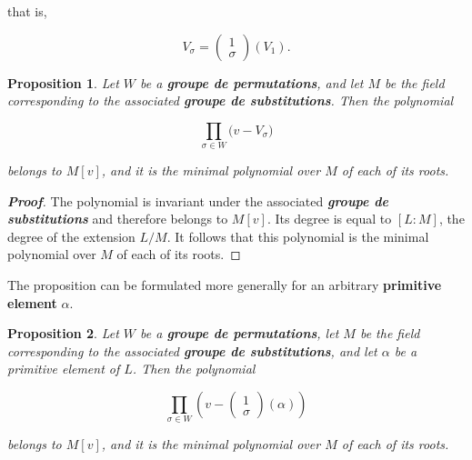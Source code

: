 \documentclass[a4paper,11pt]{article}
\newtheorem{proposition}{Proposition}
\begin{document}
that is,

\[
V_\sigma=
\begin{pmatrix}
1\\
\sigma
\end{pmatrix}(V_1).
\]

\begin{proposition}
\label{prop:nuttig}
Let \(W\) be a \textbf{\textit{groupe de permutations}}, and let \(M\) be the field corresponding to the associated \textbf{\textit{groupe de substitutions}}. Then the polynomial

\[
\prod_{\sigma\in W}\bigl(v-V_\sigma\bigr)
\]

belongs to \(M[v]\), and it is the minimal polynomial over \(M\) of each of its roots.
\end{proposition}

\begin{proof}[\normalfont\bfseries Proof]

The polynomial is invariant under the associated \textbf{\textit{groupe de substitutions}} and therefore belongs to \(M[v]\). Its degree is equal to \([L:M]\), the degree of the extension \(L/M\). It follows that this polynomial is the minimal polynomial over \(M\) of each of its roots.

\end{proof}

The proposition can be formulated more generally for an arbitrary \textbf{primitive element} \(\alpha\).

\begin{proposition}
\label{prop:nut}
Let \(W\) be a \textbf{\textit{groupe de permutations}}, let \(M\) be the field corresponding to the associated \textbf{\textit{groupe de substitutions}}, and let \(\alpha\) be a primitive element of \(L\). Then the polynomial

\[
\prod_{\sigma\in W}
\left(
v-
\begin{pmatrix}
	1\\
	\sigma
\end{pmatrix}(\alpha)
\right)
\]

belongs to \(M[v]\), and it is the minimal polynomial over \(M\) of each of its roots.
\end{proposition}
\end{document}
